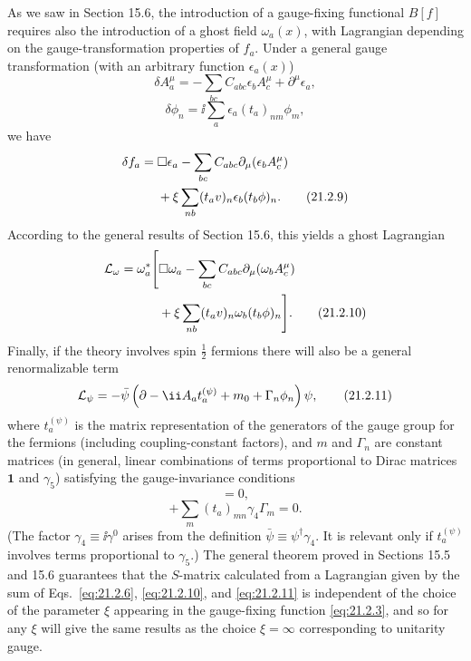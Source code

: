 As we saw in Section 15.6, the introduction of a gauge-fixing functional
$B[f]$ requires also the introduction of a ghost field $\omega_a(x)$,
with Lagrangian depending on the gauge-transformation properties of
$f_a$. Under a general gauge transformation (with an arbitrary
function $\epsilon_a(x)$)
\begin{equation}
 \delta A_a^\mu
 =-\sum_{bc}C_{abc}
 \epsilon_b A_c^\mu+\partial^\mu\epsilon_a,
 \tag{21.2.7}\label{eq:21.2.7}
\end{equation}
\begin{equation}
 \delta\phi_n=\ii\sum_a
 \epsilon_a(t_a)_{nm}\phi_m,
 \tag{21.2.8}\label{eq:21.2.8}
\end{equation}
we have
\begin{align}
 \delta f_a={}&\Box\epsilon_a
 -\sum_{bc}C_{abc}
 \partial_\mu(\epsilon_b A_c^\mu)
 \notag\\
 &+\xi\sum_{nb}(t_a v)_n
 \epsilon_b(t_b\phi)_n.
 \tag{21.2.9}\label{eq:21.2.9}
\end{align}
According to the general results of Section 15.6, this yields a ghost
Lagrangian
\begin{align}
 \mathcal L_\omega=\omega_a^*\Bigg[
 &\Box\omega_a
 -\sum_{bc}C_{abc}
 \partial_\mu(\omega_b A_c^\mu)
 \notag\\
 &+\xi\sum_{nb}(t_a v)_n
 \omega_b(t_b\phi)_n\Bigg].
 \tag{21.2.10}\label{eq:21.2.10}
\end{align}
Finally, if the theory involves spin $\frac12$ fermions there will also be a
general renormalizable term
\begin{equation}
 \mathcal L_\psi
 =-\bar\psi\left(
 \sl{\partial}-\ii\sl{A}_a t_a^{(\psi)}
 +m_0+\Gamma_n\phi_n\right)\psi,
 \tag{21.2.11}\label{eq:21.2.11}
\end{equation}
where $t_a^{(\psi)}$ is the matrix representation of the generators of
the gauge group for the fermions (including coupling-constant factors), and
$m$ and $\Gamma_n$ are constant matrices (in general, linear combinations
of terms proportional to Dirac matrices $\mathbf{1}$ and $\gamma_5$)
satisfying the gauge-invariance conditions
\begin{equation}
 [t_a^{(\psi)},\gamma_4m_0]=0,
 \tag{21.2.12}\label{eq:21.2.12}
\end{equation}
\begin{equation}
 [t_a^{(\psi)},\gamma_4\Gamma_n]
 +\sum_m(t_a)_{mn}\gamma_4\Gamma_m=0.
 \tag{21.2.13}\label{eq:21.2.13}
\end{equation}
(The factor $\gamma_4\equiv \ii\gamma^0$ arises from the definition
$\bar\psi\equiv\psi^\dagger\gamma_4$. It is relevant only if
$t_a^{(\psi)}$ involves terms proportional to $\gamma_5$.) The general
theorem proved in Sections 15.5 and 15.6 guarantees that the $S$-matrix
calculated from a Lagrangian given by the sum of Eqs.~\eqref{eq:21.2.6},
\eqref{eq:21.2.10}, and \eqref{eq:21.2.11} is independent of the choice of
the parameter $\xi$ appearing in the gauge-fixing function
\eqref{eq:21.2.3}, and so for any $\xi$ will give the same results as the
choice $\xi=\infty$ corresponding to unitarity gauge.

